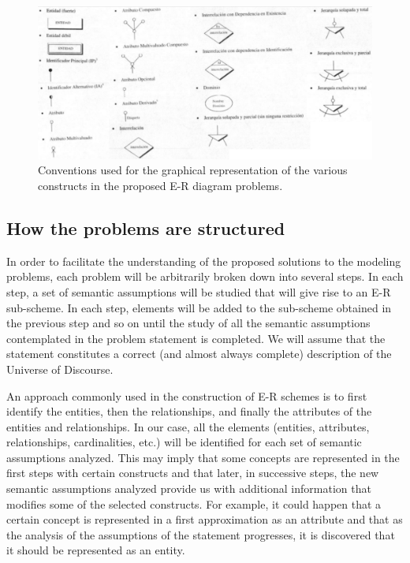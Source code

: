 \documentclass{article}
\begin{document}
\begin{figure}
    \centering
    \includegraphics[width=\textwidth]{figures/notation}
    \caption{Conventions used for the graphical representation of the various constructs in the proposed E-R diagram problems.}
    \label{fig:notation}
\end{figure}

\subsection{How the problems are structured}

In order to facilitate the understanding of the proposed solutions to the modeling problems, each problem will be arbitrarily broken down into several steps.  In each step, a set of semantic assumptions will be studied that will give rise to an E-R sub-scheme.  In each step, elements will be added to the sub-scheme obtained in the previous step and so on until the study of all the semantic assumptions contemplated in the problem statement is completed.  We will assume that the statement constitutes a correct (and almost always complete) description of the Universe of Discourse.

An approach commonly used in the construction of E-R schemes is to first identify the entities, then the relationships, and finally the attributes of the entities and relationships.  In our case, all the elements (entities, attributes, relationships, cardinalities, etc.) will be identified for each set of semantic assumptions analyzed.  This may imply that some concepts are represented in the first steps with certain constructs and that later, in successive steps, the new semantic assumptions analyzed provide us with additional information that modifies some of the selected constructs.  For example, it could happen that a certain concept is represented in a first approximation as an attribute and that as the analysis of the assumptions of the statement progresses, it is discovered that it should be represented as an entity.
\end{document}
